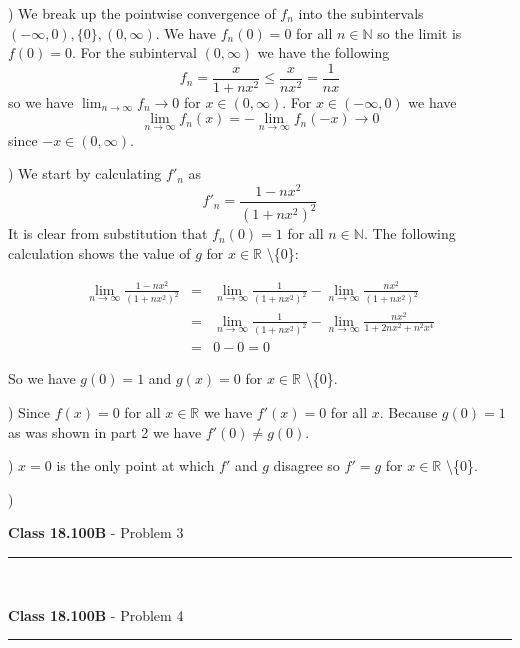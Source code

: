 \documentclass[11pt,reqno]{article}
\begin{document}
) We break up the pointwise convergence of $f_n$ into the subintervals $(-\infty,0),\{0\},(0,\infty)$. We have $f_n(0) = 0$ for all $n \in \mathbb{N}$ so the limit is $f(0) = 0$. For the subinterval $(0,\infty)$ we have the following 
\[ f_n = \frac{x}{1+ nx^2} \le \frac{x}{nx^2} = \frac{1}{nx}\]
so we have $\lim_{n \to \infty} f_n \to 0$ for $x \in (0,\infty)$. For $x \in (-\infty,0)$ we have \[ \lim_{n \to \infty} f_n(x) = - \lim_{n \to \infty} f_n(-x) \to 0 \] since $-x \in (0,\infty)$.

) We start by calculating $f'_n$ as 
\[ f'_n = \frac{1-nx^2}{(1+nx^2)^2} \]
It is clear from substitution that $f_n(0) = 1$ for all $n \in \mathbb{N}$. The following calculation shows the value of $g$ for $x \in \mathbb{R}$ \textbackslash\{0\}:

\begin{eqnarray*}
\lim_{n \to \infty}  \frac{1-nx^2}{(1+nx^2)^2} &=& \lim_{n \to \infty} \frac{1}{(1+nx^2)^2}  -  \lim_{n \to \infty} \frac{nx^2}{(1+nx^2)^2} \\
&=& \lim_{n \to \infty} \frac{1}{(1+nx^2)^2}  -  \lim_{n \to \infty} \frac{nx^2}{1+2n x^2+n^2 x^4}\\
&=& 0 - 0 = 0
\end{eqnarray*}

\noindent So we have $g(0) = 1$ and $g(x) = 0$ for $x \in \mathbb{R}$ \textbackslash\{0\}.

) Since $f(x) = 0$ for all $x \in \mathbb{R}$ we have $f'(x) = 0$ for all $x$. Because $g(0) = 1$ as was shown in part 2 we have $f'(0) \neq g(0)$.

) $x = 0$ is the only point at which $f'$ and $g$ disagree so $f' = g$ for $x \in \mathbb{R}$ \textbackslash \{0\}.

) 

\vspace{15pt}
\begin{flushleft} 
\textbf{Class 18.100B} - Problem 3\\
\rule{500pt}{1pt}\\
\end{flushleft} 


 
\vspace{15pt}
\begin{flushleft} 
\textbf{Class 18.100B} - Problem 4\\
\rule{500pt}{1pt}\\
\end{flushleft} 
\end{document}
